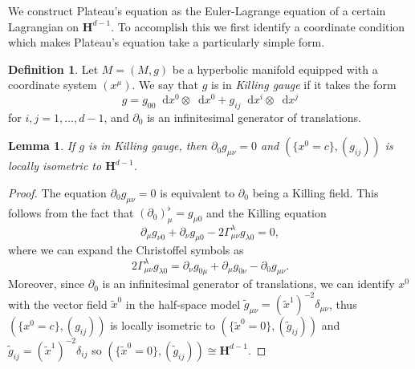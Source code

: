 \documentclass[reqno,12pt,letterpaper]{amsart}
\newcommand{\Hyp}{\mathbf H}
\newcommand*\dif{\mathop{}\!\mathrm{d}}
\newcommand{\dfn}[1]{\emph{#1}\index{#1}}
\newtheorem{lemma}[theorem]{Lemma}
\theoremstyle{definition}
\newtheorem{definition}[theorem]{Definition}
\numberwithin{equation}{section}
\begin{document}
We construct Plateau's equation as the Euler-Lagrange equation of a certain Lagrangian on $\Hyp^{d - 1}$.
To accomplish this we first identify a coordinate condition which makes Plateau's equation take a particularly simple form.

\begin{definition}
Let $M = (M, g)$ be a hyperbolic manifold equipped with a coordinate system $(x^\mu)$.
We say that $g$ is in \dfn{Killing gauge} if it takes the form
$$g = g_{00} \dif x^0 \otimes \dif x^0 + g_{ij} \dif x^i \otimes \dif x^j$$
for $i, j = 1, \dots, d - 1$, and $\partial_0$ is an infinitesimal generator of translations.
\end{definition}

\begin{lemma}
If $g$ is in Killing gauge, then $\partial_0 g_{\mu\nu} = 0$ and $(\{x^0 = c\}, (g_{ij}))$ is locally isometric to $\Hyp^{d - 1}$.
\end{lemma}
\begin{proof}
The equation $\partial_0 g_{\mu\nu} = 0$ is equivalent to $\partial_0$ being a Killing field. This follows from the fact that $(\partial_0)^\flat_\mu = g_{\mu 0}$ and the Killing equation
$$\partial_\mu g_{\nu 0} + \partial_\nu g_{\mu 0} - 2\Gamma_{\mu \nu}^\lambda g_{\lambda 0} = 0,$$
where we can expand the Christoffel symbols as
$$2 \Gamma^\lambda_{\mu \nu} g_{\lambda 0} = \partial_\nu g_{0 \mu} + \partial_\mu g_{0 \nu} - \partial_0 g_{\mu \nu}.$$
Moreover, since $\partial_0$ is an infinitesimal generator of translations, we can identify $x^0$ with the vector field $\tilde x^0$ in the half-space model $\tilde g_{\mu\nu} = (\tilde x^1)^{-2} \delta_{\mu\nu}$, thus $(\{x^0 = c\}, (g_{ij}))$ is locally isometric to $(\{\tilde x^0 = 0\}, (\tilde g_{ij}))$ and $\tilde g_{ij} = (\tilde x^1)^{-2} \delta_{ij}$ so $(\{\tilde x^0 = 0\}, (\tilde g_{ij})) \cong \Hyp^{d - 1}$.
\end{proof}
\end{document}
